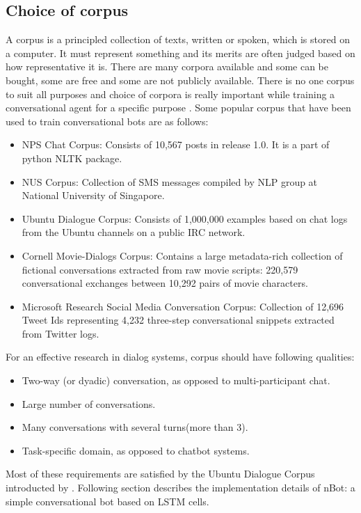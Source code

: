 \documentclass[letterpaper] {article} %
\begin{document}
\subsection{Choice of corpus}
A corpus is a principled collection of texts, written or spoken, which is stored on a computer. It must represent something and its
merits are often judged based on how representative it is. There are many corpora available and some can be bought, some are free and some are not publicly available. There is no one corpus to suit all purposes and choice of corpora is really important while training a conversational agent for a specific purpose \cite{o2007corpus}. Some popular corpus that have been used to train conversational bots are as follows:
\begin{itemize}
	\item NPS Chat Corpus: Consists of 10,567 posts in release 1.0. It is a part of python NLTK package.
	\item NUS Corpus: Collection of SMS messages compiled by NLP group at National University of Singapore.
	\item Ubuntu Dialogue Corpus: Consists of 1,000,000 examples based on chat logs from the Ubuntu channels on a public IRC network.
	\item Cornell Movie-Dialogs Corpus:  Contains a large metadata-rich collection of fictional conversations extracted from raw movie scripts: 220,579 conversational exchanges between 10,292 pairs of movie characters.
	\item Microsoft Research Social Media Conversation Corpus: Collection of 12,696 Tweet Ids representing 4,232 three-step conversational snippets extracted from Twitter logs.
\end{itemize}
For an effective research in dialog systems, corpus should have following qualities:
\begin{itemize}
	\item Two-way (or dyadic) conversation, as opposed to multi-participant chat.
	\item Large number of conversations.
	\item Many conversations with several turns(more than 3).
	\item Task-specific domain, as opposed to chatbot systems.
\end{itemize}
Most of these requirements are satisfied by the Ubuntu Dialogue Corpus introducted by \cite{lowe2015ubuntu}. Following section describes the implementation details of nBot: a simple conversational bot based on LSTM cells.
\end{document}

